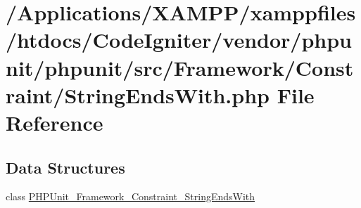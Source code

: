 \hypertarget{_string_ends_with_8php}{}\section{/\+Applications/\+X\+A\+M\+P\+P/xamppfiles/htdocs/\+Code\+Igniter/vendor/phpunit/phpunit/src/\+Framework/\+Constraint/\+String\+Ends\+With.php File Reference}
\label{_string_ends_with_8php}
\subsection*{Data Structures}
\begin{DoxyCompactItemize}
\item 
class \mbox{\hyperlink{class_p_h_p_unit___framework___constraint___string_ends_with}{P\+H\+P\+Unit\+\_\+\+Framework\+\_\+\+Constraint\+\_\+\+String\+Ends\+With}}
\end{DoxyCompactItemize}

